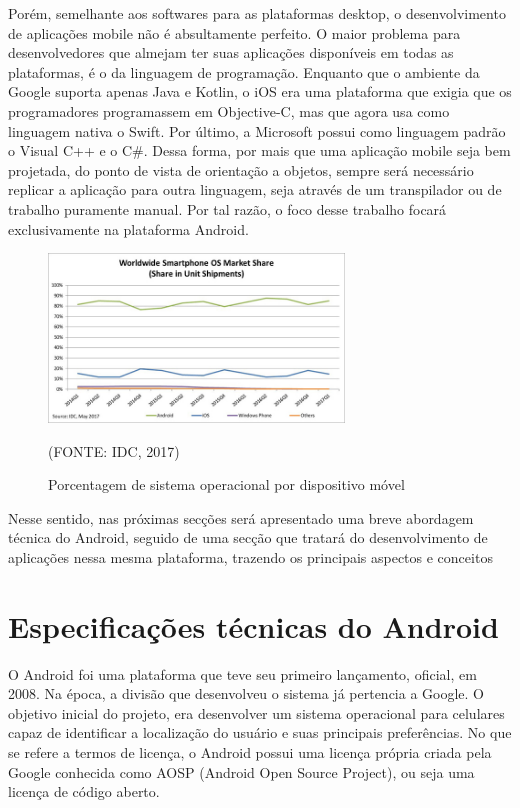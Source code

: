 \documentclass[
    12pt,       %
    openright,      %
    twoside,      %
    a4paper,      %
    english,      %
    french,       %
    spanish,      %
    brazil,       %
    ]{abntex2}
\begin{document}
      Porém, semelhante aos softwares para as plataformas desktop, o desenvolvimento de aplicações
      mobile não é absultamente perfeito. O maior problema para desenvolvedores que almejam
      ter suas aplicações disponíveis em todas as plataformas, é o da linguagem de programação.
      Enquanto que o ambiente da Google suporta apenas Java e Kotlin, o iOS era uma plataforma
      que exigia que os programadores programassem em Objective-C, mas que agora usa como linguagem
      nativa o Swift. Por último, a Microsoft possui como linguagem padrão o Visual C++ e o C\#.
      Dessa forma, por mais que uma aplicação mobile seja bem projetada, do ponto de vista de
      orientação a objetos, sempre será necessário replicar a aplicação para outra linguagem,
      seja através de um transpilador ou de trabalho puramente manual. Por tal razão, o foco
      desse trabalho focará exclusivamente na plataforma Android.

      \begin{figure}[htbp]
            \begin{center}
                \includegraphics[width=0.7\textwidth]{img/osPercentage.jpg}
            \end{center}
        \caption{\label{fig:passaro}Porcentagem de sistema operacional por dispositivo móvel}
        \begin{center}(FONTE: IDC, 2017)\end{center}
      \end{figure}

      Nesse sentido, nas próximas secções será apresentado uma breve abordagem técnica do
      Android, seguido de uma secção que tratará do desenvolvimento de aplicações nessa
      mesma plataforma, trazendo os principais aspectos e conceitos

      \section{Especificações técnicas do Android}
        O Android foi uma plataforma que teve seu primeiro lançamento, oficial, em 2008. Na época,
        a divisão que desenvolveu o sistema já pertencia a Google. O objetivo inicial do projeto,
        era desenvolver um sistema operacional para celulares capaz de identificar a localização
        do usuário e suas principais preferências. No que se refere a termos de licença, o Android
        possui uma licença própria criada pela Google conhecida como AOSP (Android Open Source
        Project), ou seja uma licença de código aberto.
\end{document}
